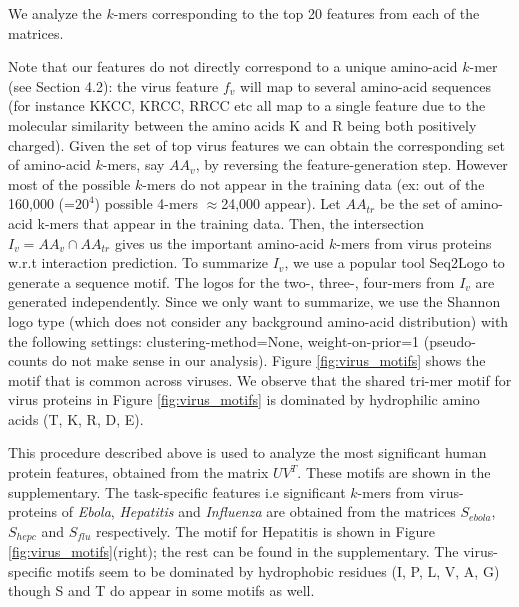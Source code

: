 \documentclass[a4paper,11pt]{article}
\begin{document}
We analyze the $k$-mers corresponding to the top 20 features from each of the matrices.

Note that our features do not directly correspond to a unique amino-acid $k$-mer (see Section 4.2):
the virus feature $f_v$ will map to several amino-acid sequences (for instance KKCC, KRCC, RRCC etc all map to a single feature due to the molecular similarity between the amino acids K and R being both positively charged). Given the set of top virus features we can obtain the corresponding set of
amino-acid $k$-mers, say $AA_v$, by reversing the feature-generation step. However most of the possible $k$-mers do not appear in the
training data (ex: out of the 160,000 (=$20^4$) possible 4-mers $\approx$24,000 appear). Let $AA_{tr}$
be the set of amino-acid k-mers that appear in the training data. Then, the intersection $I_v = AA_v \cap AA_{tr}$ gives us the important amino-acid $k$-mers from virus proteins w.r.t interaction prediction.
To summarize $I_v$, we use a popular tool Seq2Logo to generate a sequence motif.
The logos for the two-, three-, four-mers from $I_v$ are generated independently. Since we only
want to summarize, we use the Shannon logo type (which does not consider any background amino-acid distribution)
with the following settings: clustering-method=None, weight-on-prior=1 (pseudo-counts do not make sense in our
analysis). Figure \ref{fig:virus_motifs} shows the motif that is common across viruses. %
We observe that the shared tri-mer motif for virus proteins in Figure \ref{fig:virus_motifs} is dominated by
hydrophilic amino acids (T, K, R, D, E).

This procedure described above is used to analyze the most significant human protein features, obtained from
the matrix $U V^T$. These motifs are shown in the supplementary. The task-specific features i.e significant $k$-mers from virus-proteins of \textit{Ebola}, \textit{Hepatitis} and \textit{Influenza} are obtained from the matrices $S_{ebola}$, $S_{hepc}$ and $S_{flu}$ respectively. The motif for Hepatitis is shown in Figure \ref{fig:virus_motifs}(right); the rest can be found in the supplementary. %
The virus-specific motifs seem to be dominated by hydrophobic residues (I, P, L, V, A, G) though S and T do appear in some motifs as well.
\end{document}
